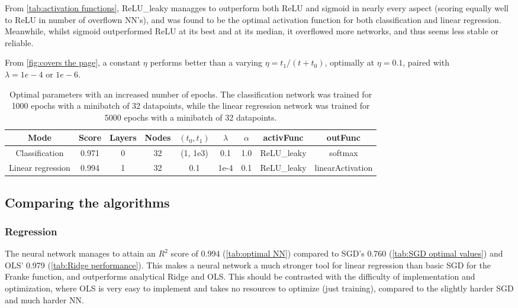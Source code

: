 \documentclass[a4paper, UKenglish]{article}
\newcommand{\0}{\mathbf{0}}
\newcommand{\1}{\mathbf{1}}
\begin{document}
From \autoref{tab:activation functions}, ReLU\_leaky managges to outperform both ReLU and sigmoid in nearly every aspect (scoring equally well to ReLU in number of overflown NN's), and was found to be the optimal activation function for both classification and linear regression. Meanwhile, whilst sigmoid outperformed ReLU at its best and at its median, it overflowed more networks, and thus seems less stable or reliable.

From \autoref{fig:covers the page}, a constant $\eta$ performs better than a varying $\eta = t_1/(t+t_0)$, optimally at $\eta = 0.1$, paired with $\lambda = 1e-4 \text{ or } 1e-6$.

\begin{table}[H] 
\centering
\caption{Optimal parameters with an increased number of epochs. The classification network was trained for 1000 epochs with a minibatch of 32 datapoints, while the linear regression network was trained for 5000 epochs with a minibatch of 32 datapoints.}
\label{tab:optimal NN}
\begin{tabular}{|c|c|c|c|c|c|c|c|c|}
  \hline
  Mode & Score & Layers & Nodes & $(t_0, t_1)$ & $\lambda$ & $\alpha$ & activFunc & outFunc\\
  \hline
  Classification & 0.971 & 0 & 32 & (1, 1e3) & 0.1 & 1.0 & ReLU\_leaky & softmax \\
  \hline
  Linear regression & 0.994 & 1 & 32 & 0.1 & 1e-4 & 0.1 & ReLU\_leaky & linearActivation \\
  \hline
\end{tabular}
\end{table}



\subsection{Comparing the algorithms} \label{sec:algorithm-comparison}
\subsubsection{Regression}
The neural network manages to attain an $R^2$ score of 0.994 (\autoref{tab:optimal NN}) compared to SGD's 0.760 (\autoref{tab:SGD optimal values}) and OLS' 0.979 (\autoref{tab:Ridge performance}). This makes a neural network a much stronger tool for linear regression than basic SGD for the Franke function, and outperforms analytical Ridge and OLS. This should be contrasted with the difficulty of implementation and optimization, where OLS is very easy to implement and takes no resources to optimize (just training), compared to the slightly harder SGD and much harder NN.
\end{document}
